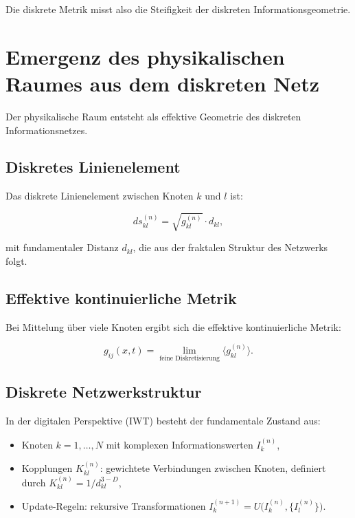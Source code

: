 Die diskrete Metrik misst also die Steifigkeit der diskreten Informationsgeometrie.

\section{Emergenz des physikalischen Raumes aus dem diskreten Netz}
\label{sec:raumemergenz}

Der physikalische Raum entsteht als effektive Geometrie des diskreten Informationsnetzes.

\subsection{Diskretes Linienelement}
\label{sub:linienelement}

Das diskrete Linienelement zwischen Knoten \( k \) und \( l \) ist:

\[
ds_{kl}^{(n)} = \sqrt{g_{kl}^{(n)}} \cdot d_{kl},
\]

mit fundamentaler Distanz \( d_{kl} \), die aus der fraktalen Struktur des Netzwerks folgt.

\subsection{Effektive kontinuierliche Metrik}
\label{sub:kontinuierliche_metrik}

Bei Mittelung über viele Knoten ergibt sich die effektive kontinuierliche Metrik:

\[
g_{ij}(x, t) = \lim_{\text{feine Diskretisierung}} \langle g_{kl}^{(n)} \rangle.
\]

\subsection{Diskrete Netzwerkstruktur}
\label{sub:netzwerkstruktur}

In der digitalen Perspektive (IWT) besteht der fundamentale Zustand aus:

\begin{itemize}
    \item Knoten \( k = 1, \dots, N \) mit komplexen Informationswerten \( I_k^{(n)} \),
    \item Kopplungen \( K_{kl}^{(n)} \): gewichtete Verbindungen zwischen Knoten, definiert durch \( K_{kl}^{(n)} = 1/d_{kl}^{3-D} \),
    \item Update-Regeln: rekursive Transformationen \( I_k^{(n+1)} = U\bigl(I_k^{(n)}, \{I_l^{(n)}\}\bigr) \).
\end{itemize}

